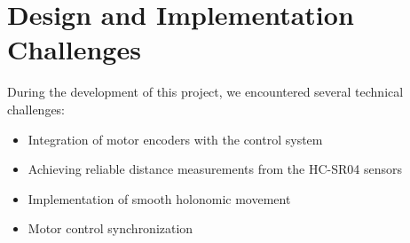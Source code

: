 \documentclass{article}
\begin{document}
\section{Design and Implementation Challenges}
During the development of this project, we encountered several technical challenges:

\begin{itemize}
\item Integration of motor encoders with the control system
\item Achieving reliable distance measurements from the HC-SR04 sensors
\item Implementation of smooth holonomic movement
\item Motor control synchronization
\end{itemize}

\newpage
\end{document}
